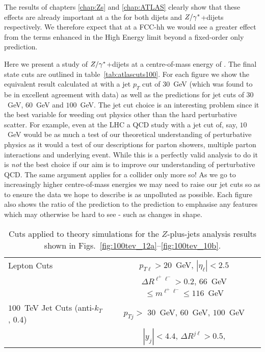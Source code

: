 	The results of chapters \ref{chap:Zs} and \ref{chap:ATLAS} clearly show that these effects are already important
	at a the \stev for both dijets and $Z/\gamma^*$+dijets respectively.  We therefore expect that at a \htev FCC-hh we would
	see a greater effect from the terms enhanced in the High Energy limit beyond a fixed-order only prediction.

	Here we present a study of $Z/\gamma^*$+dijets at a centre-of-mass energy of \htev.  The final state cuts
	are outlined in table~\eqref{tab:atlascuts100}.  For each figure we show the equivalent result calculated
	at \stev with a jet $p_T$ cut of $30$~GeV (which was found to be in excellent agreement with data) as
	well as the \htev predictions for jet cuts of $30$~GeV, $60$~GeV and $100$~GeV.  The jet cut choice
	is an interesting problem since it the best variable for weeding out physics other than the hard
	perturbative scatter.  For example, even at the \stev LHC a QCD study with a jet cut of, say,
	$10$~GeV would be as much a test of our theoretical understanding of perturbative physics as it would
	a test of our descriptions for parton showers, multiple parton interactions and underlying event.
	While this is a perfectly valid analysis to do it is \emph{not} the best choice if our aim is to
	improve our understanding of perturbative QCD.  The same argument applies for a \htev collider
	only more so!  As we go to increasingly higher centre-of-mass energies we may need to raise our
	jet cuts so as to ensure the data we hope to describe is as unpolluted as possible.  Each figure
	also shows the ratio of the \htev prediction to the \stev prediction to emphasise any features
	which may otherwise be hard to see - such as changes in shape.

	\begin{table}[bth]
	  \centering
	  \begin{tabular}{|l|c|}
	    \hline
	    Lepton Cuts & $p_{T\ell}>20$~GeV, \; $|\eta_\ell|<2.5$ \\
	    & $\Delta R^{\ell^+\ell^-} > 0.2$, \; $66$~GeV $\leq m^{\ell^+\ell^-} \leq
	      116$~GeV \\ \hline
	    $100$~TeV Jet Cuts (anti-$k_T$, 0.4) & $p_{Tj}>$ {\color{red}$30$~GeV}, {\color{green}$60$~GeV}, {\color{blue}$100$~GeV} \\
	    &  $|y_j|<4.4$, \;$\Delta R^{j\ell} >0.5$,  \\
	\hline
	  \end{tabular}
	  \caption{Cuts applied to theory simulations for the \htev
	    $Z$-plus-jets analysis results shown in Figs.~\eqref{fig:100tev_12a}--\eqref{fig:100tev_10b}.}
	  \label{tab:atlascuts100}
	\end{table}

